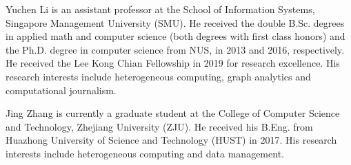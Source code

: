 \documentclass[10pt,journal,compsoc]{IEEEtran}
\begin{document}
\maketitle
\IEEEdisplaynontitleabstractindextext
\IEEEpeerreviewmaketitle











%





\begin{IEEEbiography}
	{Yuchen Li} is an assistant professor at the School of Information Systems, Singapore Management University (SMU).
	He received the double B.Sc. degrees in applied math and computer science (both degrees with first class honors)
	and the Ph.D. degree in computer science from NUS, in 2013 and 2016, respectively. He received the Lee Kong Chian Fellowship in 2019 for research excellence.
	His research interests include heterogeneous computing, graph analytics and computational journalism.
\end{IEEEbiography}
%
\begin{IEEEbiography}
	{Jing Zhang} is currently a graduate student at the College of Computer Science and Technology, Zhejiang University (ZJU). He received his B.Eng. from Huazhong University of Science and Technology (HUST) in 2017. His research interests include heterogeneous computing and data management.
\end{IEEEbiography}
\end{document}
